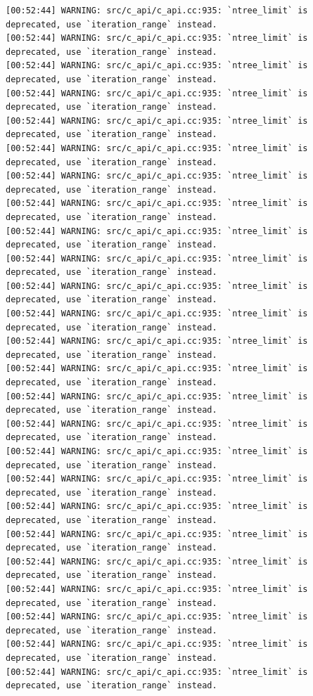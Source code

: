 \documentclass[
  letterpaper,
  DIV=11,
  numbers=noendperiod]{scrartcl}
\begin{document}
\begin{verbatim}
[00:52:44] WARNING: src/c_api/c_api.cc:935: `ntree_limit` is deprecated, use `iteration_range` instead.
[00:52:44] WARNING: src/c_api/c_api.cc:935: `ntree_limit` is deprecated, use `iteration_range` instead.
[00:52:44] WARNING: src/c_api/c_api.cc:935: `ntree_limit` is deprecated, use `iteration_range` instead.
[00:52:44] WARNING: src/c_api/c_api.cc:935: `ntree_limit` is deprecated, use `iteration_range` instead.
[00:52:44] WARNING: src/c_api/c_api.cc:935: `ntree_limit` is deprecated, use `iteration_range` instead.
[00:52:44] WARNING: src/c_api/c_api.cc:935: `ntree_limit` is deprecated, use `iteration_range` instead.
[00:52:44] WARNING: src/c_api/c_api.cc:935: `ntree_limit` is deprecated, use `iteration_range` instead.
[00:52:44] WARNING: src/c_api/c_api.cc:935: `ntree_limit` is deprecated, use `iteration_range` instead.
[00:52:44] WARNING: src/c_api/c_api.cc:935: `ntree_limit` is deprecated, use `iteration_range` instead.
[00:52:44] WARNING: src/c_api/c_api.cc:935: `ntree_limit` is deprecated, use `iteration_range` instead.
[00:52:44] WARNING: src/c_api/c_api.cc:935: `ntree_limit` is deprecated, use `iteration_range` instead.
[00:52:44] WARNING: src/c_api/c_api.cc:935: `ntree_limit` is deprecated, use `iteration_range` instead.
[00:52:44] WARNING: src/c_api/c_api.cc:935: `ntree_limit` is deprecated, use `iteration_range` instead.
[00:52:44] WARNING: src/c_api/c_api.cc:935: `ntree_limit` is deprecated, use `iteration_range` instead.
[00:52:44] WARNING: src/c_api/c_api.cc:935: `ntree_limit` is deprecated, use `iteration_range` instead.
[00:52:44] WARNING: src/c_api/c_api.cc:935: `ntree_limit` is deprecated, use `iteration_range` instead.
[00:52:44] WARNING: src/c_api/c_api.cc:935: `ntree_limit` is deprecated, use `iteration_range` instead.
[00:52:44] WARNING: src/c_api/c_api.cc:935: `ntree_limit` is deprecated, use `iteration_range` instead.
[00:52:44] WARNING: src/c_api/c_api.cc:935: `ntree_limit` is deprecated, use `iteration_range` instead.
[00:52:44] WARNING: src/c_api/c_api.cc:935: `ntree_limit` is deprecated, use `iteration_range` instead.
[00:52:44] WARNING: src/c_api/c_api.cc:935: `ntree_limit` is deprecated, use `iteration_range` instead.
[00:52:44] WARNING: src/c_api/c_api.cc:935: `ntree_limit` is deprecated, use `iteration_range` instead.
[00:52:44] WARNING: src/c_api/c_api.cc:935: `ntree_limit` is deprecated, use `iteration_range` instead.
[00:52:44] WARNING: src/c_api/c_api.cc:935: `ntree_limit` is deprecated, use `iteration_range` instead.
[00:52:44] WARNING: src/c_api/c_api.cc:935: `ntree_limit` is deprecated, use `iteration_range` instead.

\end{verbatim}
\end{document}
